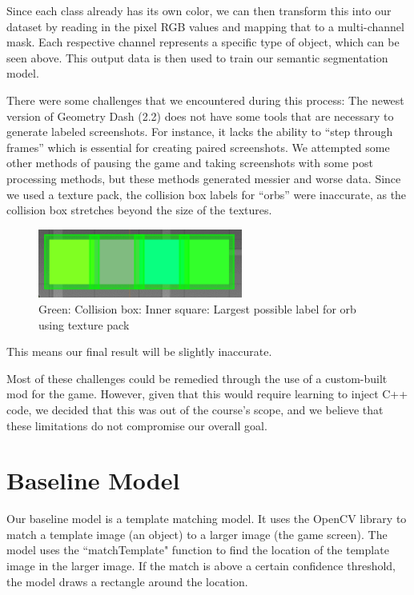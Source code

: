 \documentclass{article} %
\begin{document}
Since each class already has its own color, we can then transform this into our dataset by reading in the pixel RGB values and mapping that to a multi-channel mask. Each respective channel represents a specific type of object, which can be seen above. This output data is then used to train our semantic segmentation model.

There were some challenges that we encountered during this process:
The newest version of Geometry Dash (2.2) does not have some tools that are necessary to generate labeled screenshots. For instance, it lacks the ability to “step through frames” which is essential for creating paired screenshots. We attempted some other methods of pausing the game and taking screenshots with some post processing methods, but these methods generated messier and worse data.
Since we used a texture pack, the collision box labels for “orbs” were inaccurate, as the collision box stretches beyond the size of the textures.

\begin{figure}[!h]
\begin{center}
\includegraphics[width=0.6\textwidth]{Figs/collision_box_issues.png}
\end{center}
\caption{Green: Collision box: Inner square: Largest possible label for orb using texture pack}
\label{fig:collision_box_issues}
\end{figure}


This means our final result will be slightly inaccurate.

Most of these challenges could be remedied through the use of a custom-built mod for the game. However, given that this would require learning to inject C++ code, we decided that this was out of the course’s scope, and we believe that these limitations do not compromise our overall goal.


\section{Baseline Model}

Our baseline model is a template matching model. It uses the OpenCV library to match a template image (an object) to a larger image (the game screen). The model uses the “matchTemplate" function to find the location of the template image in the larger image. If the match is above a certain confidence threshold, the model draws a rectangle around the location.
\end{document}
